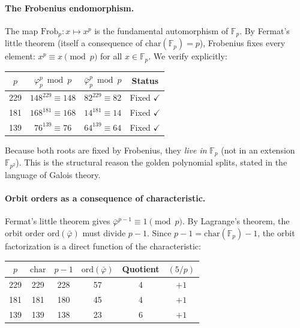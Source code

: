 \documentclass[12pt,oneside]{article}
\theoremstyle{principia}
\theoremstyle{definition}
\theoremstyle{remark}
\begin{document}
\paragraph{The Frobenius endomorphism.}
The map $\mathrm{Frob}_p: x \mapsto x^p$ is the fundamental automorphism of $\mathbb{F}_p$. By Fermat's little theorem (itself a consequence of $\mathrm{char}(\mathbb{F}_p) = p$), Frobenius fixes every element: $x^p \equiv x \pmod{p}$ for all $x \in \mathbb{F}_p$. We verify explicitly:
\begin{center}
\begin{tabular}{@{}cccc@{}}
\toprule
$p$ & $\varphi_p^p \bmod p$ & $\bar\varphi_p^p \bmod p$ & Status \\
\midrule
229 & $148^{229} \equiv 148$ & $82^{229} \equiv 82$ & Fixed $\checkmark$ \\
181 & $168^{181} \equiv 168$ & $14^{181} \equiv 14$ & Fixed $\checkmark$ \\
139 & $76^{139} \equiv 76$ & $64^{139} \equiv 64$ & Fixed $\checkmark$ \\
\bottomrule
\end{tabular}
\end{center}
Because both roots are fixed by Frobenius, they \emph{live in} $\mathbb{F}_p$ (not in an extension $\mathbb{F}_{p^2}$). This is the structural reason the golden polynomial splits, stated in the language of Galois theory.

\paragraph{Orbit orders as a consequence of characteristic.}
Fermat's little theorem gives $\bar\varphi^{p-1} \equiv 1 \pmod{p}$. By Lagrange's theorem, the orbit order $\mathrm{ord}(\bar\varphi)$ must divide $p - 1$. Since $p - 1 = \mathrm{char}(\mathbb{F}_p) - 1$, the orbit factorization is a direct function of the characteristic:

\begin{center}
\begin{tabular}{@{}cccccc@{}}
\toprule
$p$ & $\mathrm{char}$ & $p - 1$ & $\mathrm{ord}(\bar\varphi)$ & Quotient & $(5/p)$ \\
\midrule
229 & 229 & 228 & 57 & 4 & $+1$ \\
181 & 181 & 180 & 45 & 4 & $+1$ \\
139 & 139 & 138 & 23 & 6 & $+1$ \\
\bottomrule
\end{tabular}
\end{center}
\end{document}
